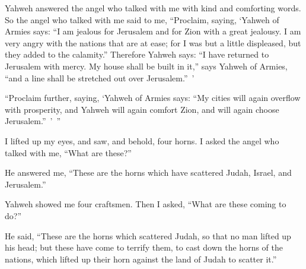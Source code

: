 {\par }{\PP {}Yahweh answered the angel who talked with me with kind and comforting words.
So the angel who talked with me said to me, “Proclaim, saying, ‘Yahweh of Armies says: “I am jealous for Jerusalem and for Zion with a great jealousy.
I am very angry with the nations that are at ease; for I was but a little displeased, but they added to the calamity.”
Therefore Yahweh says: “I have returned to Jerusalem with mercy. My house shall be built in it,” says Yahweh of Armies, “and a line shall be stretched out over Jerusalem.” ’
\par }{\PP {}“Proclaim further, saying, ‘Yahweh of Armies says: “My cities will again overflow with prosperity, and Yahweh will again comfort Zion, and will again choose Jerusalem.” ’ ”
\par }{\PP {}I lifted up my eyes, and saw, and behold, four horns.
I asked the angel who talked with me, “What are these?”
\par }{\PP He answered me, “These are the horns which have scattered Judah, Israel, and Jerusalem.”
\par }{\PP {}Yahweh showed me four craftsmen.
Then I asked, “What are these coming to do?”
\par }{\PP He said, “These are the horns which scattered Judah, so that no man lifted up his head; but these have come to terrify them, to cast down the horns of the nations, which lifted up their horn against the land of Judah to scatter it.”

}
